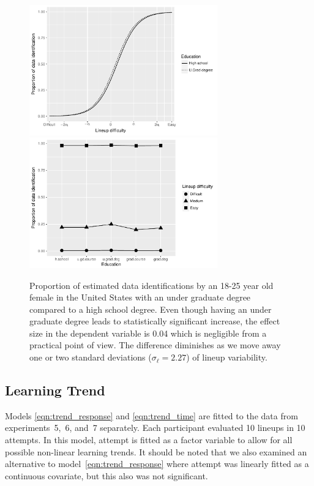 \documentclass[10pt]{article}\usepackage[]{graphicx}\usepackage[]{xcolor}
\begin{document}
\begin{figure}[htbp] 
   \centering
    \includegraphics[width=3.2in]{practical_impact_und_graduate.pdf} 
    \includegraphics[width=3.2in]{practical_impact_degree.pdf} 
   \caption{Proportion of estimated data identifications by an 18-25 year old female in the United States with an under graduate degree compared to a high school degree. Even though having an under graduate degree leads to  statistically significant increase, the effect size in the dependent variable is  0.04 which is  negligible from a practical point of view. The difference diminishes as we move away one or two standard deviations ($\sigma_{\ell} = 2.27$) 
   of lineup variability.}
   \label{practical_impact_und_und_graduate.pdf}
\end{figure}




\subsection{Learning Trend} Models \eqref{eqn:trend_response} and \eqref{eqn:trend_time} are fitted to the data from experiments~5,~6, and~7 separately. Each participant evaluated 10 lineups in 10 attempts. In this model, attempt is fitted as a factor variable to allow for all possible non-linear learning trends.  It should be noted that we also examined an alternative to model~\eqref{eqn:trend_response} where attempt was linearly fitted as a continuous covariate, but this also was not significant.
\end{document}
